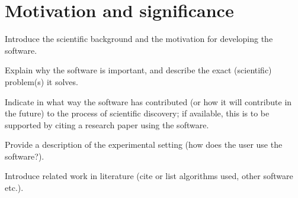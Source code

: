 \section{Motivation and significance}
\label{} 

Introduce the scientific background and the motivation for developing the software.


Explain why the software is important, and describe the exact (scientific) problem(s) it solves.


Indicate in what way the software has contributed (or how it will contribute in the future) to the process of scientific discovery; if available, this is to be supported by citing a research paper using the software.


Provide a description of the experimental setting (how does the user use the software?).


Introduce related work in literature (cite or list algorithms used, other software etc.).
